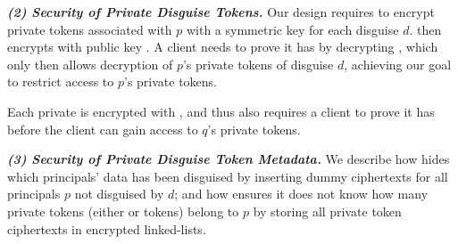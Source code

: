 \vspace{6pt}\noindent\textbf{\emph{(2) Security of Private Disguise Tokens.}}
Our design requires \sys to encrypt private \tdata{} tokens associated with $p$ with a symmetric key
 for each disguise $d$. \sys then encrypts  with public key .  
A client needs to prove it has  by decrypting , which only then allows decryption
of $p$'s private tokens of disguise $d$, achieving our goal to restrict access to $p$'s private
tokens.

Each private  is encrypted with , and thus also requires a client to prove it has
 before the client can gain access to $q$'s private tokens.

\vspace{6pt}\noindent\textbf{\emph{(3) Security of Private Disguise Token Metadata.}}
We describe how \sys hides which principals' data has
been disguised by inserting dummy  ciphertexts for all principals $p$ not disguised by $d$;
and how \sys ensures it does not know how many private tokens (either \tdata{} or \tpriv{} tokens) belong to $p$ by storing all private token ciphertexts in encrypted linked-lists.
